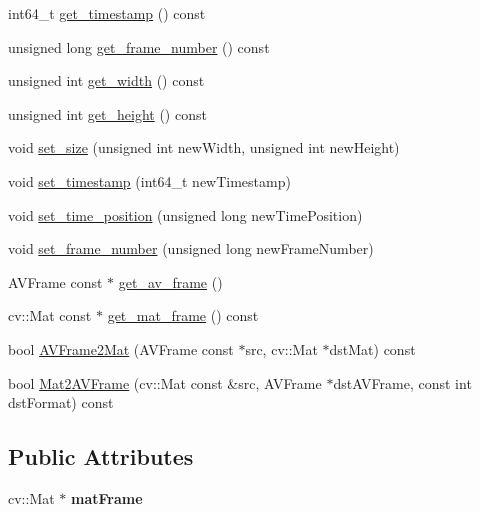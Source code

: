 \begin{DoxyCompactItemize}
\item 
int64\+\_\+t \hyperlink{classVideoFrame_a9aa709fcbef2d392cb2a2493af189e91}{get\+\_\+timestamp} () const 
\item 
unsigned long \hyperlink{classVideoFrame_ae090e27da560e3a56dc1ca684e382816}{get\+\_\+frame\+\_\+number} () const 
\item 
unsigned int \hyperlink{classVideoFrame_a4b9af98d459fa34fea270d19768e3f86}{get\+\_\+width} () const 
\item 
unsigned int \hyperlink{classVideoFrame_a20816b24fbb4df819db961bb1b04546f}{get\+\_\+height} () const 
\item 
void \hyperlink{classVideoFrame_a83a8984ee14793bb57b07b409d7b36da}{set\+\_\+size} (unsigned int new\+Width, unsigned int new\+Height)
\item 
void \hyperlink{classVideoFrame_a514a598a06ecb3451192ea3946ab82fc}{set\+\_\+timestamp} (int64\+\_\+t new\+Timestamp)
\item 
void \hyperlink{classVideoFrame_aafed4e7076d4c494e8cb8a75fb158281}{set\+\_\+time\+\_\+position} (unsigned long new\+Time\+Position)
\item 
void \hyperlink{classVideoFrame_a80c39331c68ae3ba658ec6cf9a7b088d}{set\+\_\+frame\+\_\+number} (unsigned long new\+Frame\+Number)
\item 
A\+V\+Frame const $\ast$ \hyperlink{classVideoFrame_ab6c2c0442a4f7bea1193ccf95e5dec6f}{get\+\_\+av\+\_\+frame} ()
\item 
cv\+::\+Mat const $\ast$ \hyperlink{classVideoFrame_ae910256ad8a16261eb676e0f4f93183e}{get\+\_\+mat\+\_\+frame} () const 
\item 
bool \hyperlink{classVideoFrame_a61f14009edeb2d8b1104f4952c23b2d4}{A\+V\+Frame2\+Mat} (A\+V\+Frame const $\ast$src, cv\+::\+Mat $\ast$dst\+Mat) const 
\item 
bool \hyperlink{classVideoFrame_a78b9ebc82b2d22d040895c21452729cc}{Mat2\+A\+V\+Frame} (cv\+::\+Mat const \&src, A\+V\+Frame $\ast$dst\+A\+V\+Frame, const int dst\+Format) const 
\end{DoxyCompactItemize}
\subsection*{Public Attributes}
\begin{DoxyCompactItemize}
\item 
\hypertarget{classVideoFrame_abc5f6e851190c1b76e22cd0e7ed38505}{}cv\+::\+Mat $\ast$ {\bfseries mat\+Frame}\label{classVideoFrame_abc5f6e851190c1b76e22cd0e7ed38505}

\end{DoxyCompactItemize}


